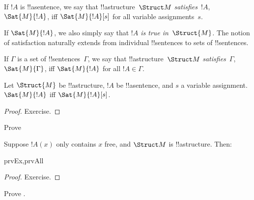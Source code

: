 \documentclass[../../../include/open-logic-section]{subfiles}
\begin{document}
\begin{defn}
If $!A$ is !!a{sentence}, we say that !!a{structure}~$\Struct M$
\emph{satisfies}~$!A$, $\Sat{M}{!A}$, iff $\Sat{M}{!A}[s]$ for all
variable assignments~$s$.
\end{defn}

If $\Sat{M}{!A}$, we also simply say that \emph{$!A$ is true
in~$\Struct{M}$.} The notion of satisfaction naturally extends
from individual !!{sentence}s to sets of !!{sentence}s.

\begin{defn}
If $\Gamma$ is a set of !!{sentence}s~$\Gamma$, we say that
!!a{structure}~$\Struct M$ \emph{satisfies}~$\Gamma$,
$\Sat{M}{\Gamma}$, iff $\Sat{M}{!A}$ for all $!A \in \Gamma$.
\end{defn}

\begin{prop}
  Let $\Struct{M}$ be !!a{structure}, $!A$ be !!a{sentence}, and $s$ a
  variable assignment.  $\Sat{M}{!A}$ iff $\Sat{M}{!A}[s]$.
\end{prop}

\begin{proof}
Exercise.
\end{proof}

\begin{prob}
Prove 
\end{prob}

\begin{prop}
  Suppose $!A(x)$ only contains $x$ free, and $\Struct M$ is
  !!a{structure}. Then:
  \begin{tagenumerate}{prvEx,prvAll}
\end{tagenumerate}
\end{prop}

\begin{proof}
Exercise.
\end{proof}

\begin{prob}
Prove .
\end{prob}
\end{document}
